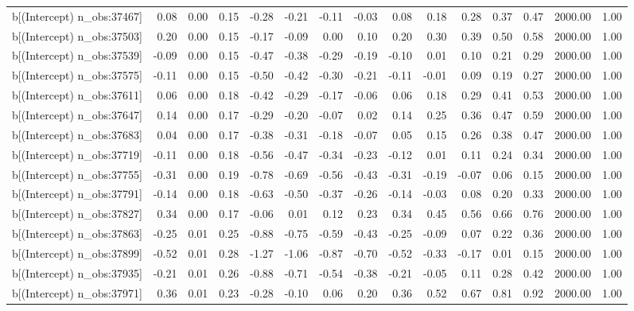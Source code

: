 \begin{table}[ht]
\begin{tabular}{rrrrrrrrrrrrrrr}
  b[(Intercept) n\_obs:37467] & 0.08 & 0.00 & 0.15 & -0.28 & -0.21 & -0.11 & -0.03 & 0.08 & 0.18 & 0.28 & 0.37 & 0.47 & 2000.00 & 1.00 \\ 
  b[(Intercept) n\_obs:37503] & 0.20 & 0.00 & 0.15 & -0.17 & -0.09 & 0.00 & 0.10 & 0.20 & 0.30 & 0.39 & 0.50 & 0.58 & 2000.00 & 1.00 \\ 
  b[(Intercept) n\_obs:37539] & -0.09 & 0.00 & 0.15 & -0.47 & -0.38 & -0.29 & -0.19 & -0.10 & 0.01 & 0.10 & 0.21 & 0.29 & 2000.00 & 1.00 \\ 
  b[(Intercept) n\_obs:37575] & -0.11 & 0.00 & 0.15 & -0.50 & -0.42 & -0.30 & -0.21 & -0.11 & -0.01 & 0.09 & 0.19 & 0.27 & 2000.00 & 1.00 \\ 
  b[(Intercept) n\_obs:37611] & 0.06 & 0.00 & 0.18 & -0.42 & -0.29 & -0.17 & -0.06 & 0.06 & 0.18 & 0.29 & 0.41 & 0.53 & 2000.00 & 1.00 \\ 
  b[(Intercept) n\_obs:37647] & 0.14 & 0.00 & 0.17 & -0.29 & -0.20 & -0.07 & 0.02 & 0.14 & 0.25 & 0.36 & 0.47 & 0.59 & 2000.00 & 1.00 \\ 
  b[(Intercept) n\_obs:37683] & 0.04 & 0.00 & 0.17 & -0.38 & -0.31 & -0.18 & -0.07 & 0.05 & 0.15 & 0.26 & 0.38 & 0.47 & 2000.00 & 1.00 \\ 
  b[(Intercept) n\_obs:37719] & -0.11 & 0.00 & 0.18 & -0.56 & -0.47 & -0.34 & -0.23 & -0.12 & 0.01 & 0.11 & 0.24 & 0.34 & 2000.00 & 1.00 \\ 
  b[(Intercept) n\_obs:37755] & -0.31 & 0.00 & 0.19 & -0.78 & -0.69 & -0.56 & -0.43 & -0.31 & -0.19 & -0.07 & 0.06 & 0.15 & 2000.00 & 1.00 \\ 
  b[(Intercept) n\_obs:37791] & -0.14 & 0.00 & 0.18 & -0.63 & -0.50 & -0.37 & -0.26 & -0.14 & -0.03 & 0.08 & 0.20 & 0.33 & 2000.00 & 1.00 \\ 
  b[(Intercept) n\_obs:37827] & 0.34 & 0.00 & 0.17 & -0.06 & 0.01 & 0.12 & 0.23 & 0.34 & 0.45 & 0.56 & 0.66 & 0.76 & 2000.00 & 1.00 \\ 
  b[(Intercept) n\_obs:37863] & -0.25 & 0.01 & 0.25 & -0.88 & -0.75 & -0.59 & -0.43 & -0.25 & -0.09 & 0.07 & 0.22 & 0.36 & 2000.00 & 1.00 \\ 
  b[(Intercept) n\_obs:37899] & -0.52 & 0.01 & 0.28 & -1.27 & -1.06 & -0.87 & -0.70 & -0.52 & -0.33 & -0.17 & 0.01 & 0.15 & 2000.00 & 1.00 \\ 
  b[(Intercept) n\_obs:37935] & -0.21 & 0.01 & 0.26 & -0.88 & -0.71 & -0.54 & -0.38 & -0.21 & -0.05 & 0.11 & 0.28 & 0.42 & 2000.00 & 1.00 \\ 
  b[(Intercept) n\_obs:37971] & 0.36 & 0.01 & 0.23 & -0.28 & -0.10 & 0.06 & 0.20 & 0.36 & 0.52 & 0.67 & 0.81 & 0.92 & 2000.00 & 1.00 \\ 

\end{tabular}
\end{table}
